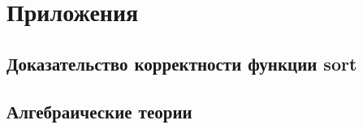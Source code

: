 \appendix
\section*{Приложения}
\renewcommand{\thesubsection}{\Alph{subsection}}

\subsection{Доказательство корректности функции sort}\label{sort_proof}

\cite{ncat:tt-ct}


\subsection{Алгебраические теории}\label{alg_th}
